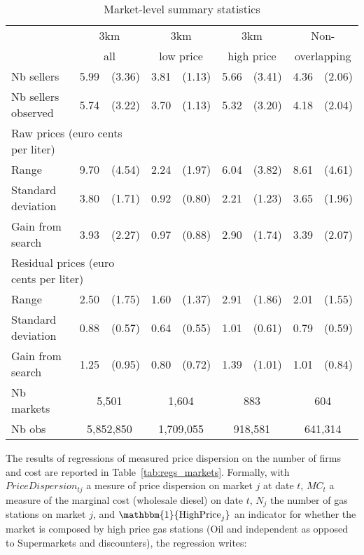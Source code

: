 \documentclass[english]{article}
\begin{document}
\begin{table}[H]
  \caption{Market-level summary statistics}
\begin{tabular}{lrrrrrrrr}
\hline
\hline
      & \multicolumn{2}{c}{3km}    & \multicolumn{2}{c}{3km}       & \multicolumn{2}{c}{3km}        & \multicolumn{2}{c}{Non-} \\
      & \multicolumn{2}{c}{all}    & \multicolumn{2}{c}{low price} & \multicolumn{2}{c}{high price} & \multicolumn{2}{c}{overlapping} \\
\hline
Nb sellers & 5.99  & (3.36) & 3.81  & (1.13) & 5.66  & (3.41) & 4.36  & (2.06) \\
Nb sellers observed & 5.74  & (3.22) & 3.70  & (1.13) & 5.32  & (3.20) & 4.18  & (2.04) \\
\hline
\multicolumn{3}{l}{Raw prices (euro cents per liter)}          &       &       &       &       &       &  \\
Range & 9.70  & (4.54) & 2.24  & (1.97) & 6.04  & (3.82) & 8.61  & (4.61) \\
Standard deviation & 3.80  & (1.71) & 0.92  & (0.80) & 2.21  & (1.23) & 3.65  & (1.96) \\
Gain from search & 3.93  & (2.27) & 0.97  & (0.88) & 2.90  & (1.74) & 3.39  & (2.07) \\
\hline
\multicolumn{3}{l}{Residual prices (euro cents per liter)}      &       &       &       &       &       &  \\
Range & 2.50  & (1.75) & 1.60  & (1.37) & 2.91  & (1.86) & 2.01  & (1.55) \\
Standard deviation & 0.88  & (0.57) & 0.64  & (0.55) & 1.01  & (0.61) & 0.79  & (0.59) \\
Gain from search & 1.25  & (0.95) & 0.80  & (0.72) & 1.39  & (1.01) & 1.01  & (0.84) \\
\hline
Nb markets & \multicolumn{2}{c}{5,501} & \multicolumn{2}{c}{1,604} & \multicolumn{2}{c}{883} & \multicolumn{2}{c}{604} \\
Nb obs     & \multicolumn{2}{c}{5,852,850} & \multicolumn{2}{c}{1,709,055} & \multicolumn{2}{c}{918,581} & \multicolumn{2}{c}{641,314} \\
\hline
\hline
\end{tabular}
\label{tab:stats_des_markets}
\end{table}

The results of regressions of measured price dispersion on the number of firms and cost are reported in Table~\ref{tab:regs_markets}. Formally, with $PriceDispersion_{tj}$ a mesure of price dispersion on market $j$ at date $t$, $MC_t$ a measure of the marginal cost (wholesale diesel) on date $t$, $N_j$ the number of gas stations on market $j$, and $\mathbbm{1}{\text{HighPrice}_{j}}$ an indicator for whether the market is composed by high price gas stations (Oil and independent as opposed to Supermarkets and discounters), the regression writes:
\end{document}
